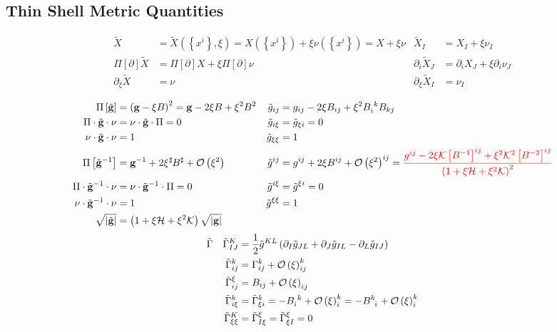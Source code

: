 \documentclass[a4paper,7pt]{scrartcl}
\newcommand{\gauss}{\mathcal{K}}
\newcommand{\mean}{\mathcal{H}}
\newcommand{\gb}{\mathbf{g}}
\newcommand{\pism}{\Pi}
\newcommand{\pis}[1]{\pism\left[ #1 \right]}
\newcommand{\landau}{\mathcal{O}}
\newcommand{\landauo}{\landau\left( \xi \right)}
\newcommand{\landaut}{\landau\left( \xi^{2} \right)}
\begin{document}
  \subsection{Thin Shell Metric Quantities}
  \begin{align*}
    \tilde{X} &= \tilde{X}\left(\left\{ x^{i} \right\},\xi\right) = X\left( \left\{ x^{i} \right\} \right) + \xi\nu\left( \left\{ x^{i} \right\} \right) = X + \xi\nu
        &\tilde{X}_{I} &= X_{I} + \xi\nu_{I} \\
    \pis{\partial}\tilde{X} &= \pis{\partial}X + \xi\pis{\partial}\nu
        &\partial_{i}\tilde{X}_{J} &= \partial_{i}X_{J} + \xi\partial_{i}\nu_{J}\\
    \partial_{\xi}\tilde{X} &= \nu
        &\partial_{\xi}\tilde{X}_{I} &= \nu_{I}\\
  \end{align*}
  \begin{align*}
    \pis{\tilde{\gb}} &= \left( \gb - \xi B \right)^{2} = \gb - 2\xi B + \xi^{2}B^{2}
          &\tilde{g}_{ij} &= g_{ij} - 2\xi B_{ij} + \xi^{2}\tensor{B}{_{i}^{k}}B_{kj}\\
    \pism\cdot\tilde{\gb}\cdot\nu &= \nu\cdot\tilde{\gb}\cdot\pism = 0
          &\tilde{g}_{i\xi} &= \tilde{g}_{\xi i} = 0\\
    \nu\cdot\tilde{\gb}\cdot\nu &= 1
          &\tilde{g}_{\xi\xi} &= 1\\
    \pis{\tilde{\gb}^{-1}} &= \gb^{-1} + 2\xi\tensor[^{\sharp}]{B}{^{\sharp}}+\landaut
          &\tilde{g}^{ij} &= g^{ij} + 2\xi B^{ij} + \landaut^{ij}
                          ={\color{red} \frac{g^{ij}-2\xi\gauss\left[ B^{-1} \right]^{ij} + \xi^{2}\gauss^{2}\left[ B^{-2} \right]^{ij}}{\left( 1 + \xi\mean + \xi^{2}\gauss \right)^{2}}}\\
    \pism\cdot\tilde{\gb}^{-1}\cdot\nu &= \nu\cdot\tilde{\gb}^{-1}\cdot\pism = 0
          &\tilde{g}^{i\xi} &= \tilde{g}^{\xi i} = 0\\
    \nu\cdot\tilde{\gb}^{-1}\cdot\nu &= 1
          &\tilde{g}^{\xi\xi} &= 1\\
    \sqrt{\left| \tilde{\gb} \right|} &= \left( 1 + \xi\mean + \xi^{2}\gauss \right)\sqrt{\left| \gb \right|}
  \end{align*}
  \begin{align*}
    \tilde{\Gamma} &
          &\tilde{\Gamma}^{K}_{IJ} &= \frac{1}{2}\tilde{g}^{KL}\left( \partial_{I}\tilde{g}_{JL} + \partial_{J}\tilde{g}_{IL} - \partial_{L}\tilde{g}_{IJ} \right)\\
         &&\tilde{\Gamma}^{k}_{ij} &= \Gamma^{k}_{ij} + \landauo^{k}_{ij}\\
         &&\tilde{\Gamma}^{\xi}_{ij} &= B_{ij} + \landauo_{ij}\\
         &&\tilde{\Gamma}^{k}_{i\xi} &= \tilde{\Gamma}^{k}_{\xi i} = -\tensor{B}{_{i}^{k}} + \landauo_{i}^{k} = -\tensor{B}{^{k}_{i}} + \landauo_{i}^{k}\\
         &&\tilde{\Gamma}^{K}_{\xi\xi} &= \tilde{\Gamma}^{\xi}_{I\xi} = \tilde{\Gamma}^{\xi}_{\xi I} = 0
  \end{align*}
\end{document}
